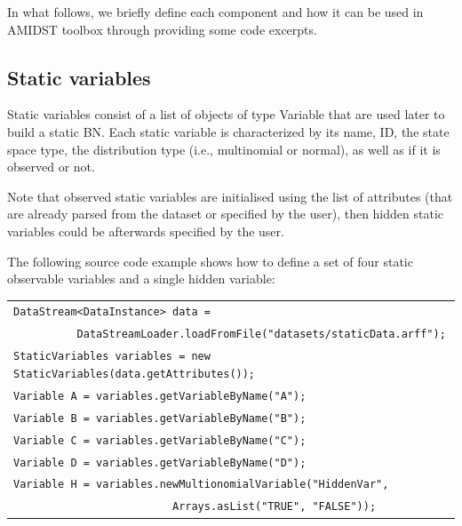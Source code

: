 In what follows, we briefly define each component and how it can be used in AMIDST toolbox through providing some code excerpts.  

\subsection{Static variables}

Static variables consist of a list of objects of type Variable that are used later to build a static BN. Each static variable is characterized by its name, ID, the state space type, the distribution type (i.e., multinomial or normal), as well as if it is observed or not. 

Note that observed static variables are initialised using the list of attributes (that are already parsed from the dataset or specified by the user), then hidden static variables could be afterwards specified by the user.

The following source code example shows how to define a set of four static observable variables and a single hidden variable:

\vspace{-0.1in}
\begin{table}[H]
\begin{tabular}{l} \\ \hline

        \texttt{DataStream<DataInstance> data = }\\
        
        \texttt{~~~~~~~~~~DataStreamLoader.loadFromFile("datasets/staticData.arff");}\\

        \texttt{StaticVariables variables = new StaticVariables(data.getAttributes());}\\

        \texttt{Variable A = variables.getVariableByName("A");}\\
        \texttt{Variable B = variables.getVariableByName("B");}\\
        \texttt{Variable C = variables.getVariableByName("C");}\\
        \texttt{Variable D = variables.getVariableByName("D");}\\

        \texttt{Variable H = variables.newMultionomialVariable("HiddenVar",}\\ \texttt{~~~~~~~~~~~~~~~~~~~~~~~~~Arrays.asList("TRUE", "FALSE"));}\\ \hline 

\end{tabular}
\end{table}


